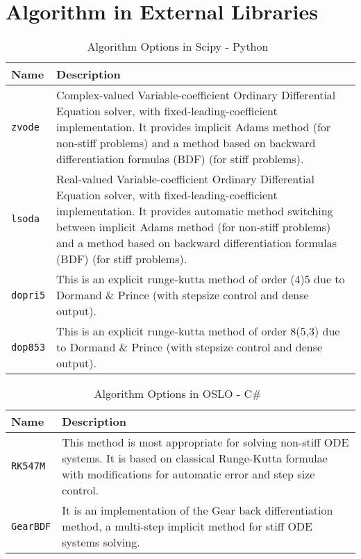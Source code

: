 	

\pagebreak

\section{Algorithm in External Libraries}
\label{alg_externallib}

\begin{table}[ht]
\begin{tabular}{ p{} p{} }
	\textbf{Name} & \textbf{Description} \\
	\toprule
	\verb|zvode| & Complex-valued Variable-coefficient Ordinary Differential Equation solver, with fixed-leading-coefficient implementation. It provides implicit Adams method (for non-stiff problems) and a method based on backward differentiation formulas (BDF) (for stiff problems).\\ \hline
	\verb|lsoda| & Real-valued Variable-coefficient Ordinary Differential Equation solver, with fixed-leading-coefficient implementation. It provides automatic method switching between implicit Adams method (for non-stiff problems) and a method based on backward differentiation formulas (BDF) (for stiff problems).\\ \hline
	\verb|dopri5| & This is an explicit runge-kutta method of order (4)5 due to Dormand \& Prince (with stepsize control and dense output).\\ \hline
	\verb|dop853| & This is an explicit runge-kutta method of order 8(5,3) due to Dormand \& Prince (with stepsize control and dense output).\\
	\bottomrule	
\end{tabular}	
\caption{Algorithm Options in Scipy - Python~\citep{scipyfun}}	
\label{tab_algscipy}
\end{table}

\begin{table}[ht]
\begin{tabular}{ p{} p{} }
	\textbf{Name} & \textbf{Description} \\
	\toprule
	\verb|RK547M| & This method is most appropriate for solving non-stiff ODE systems. It is based on classical Runge-Kutta formulae with modifications for automatic error and step size control.\\ \hline
	\verb|GearBDF| & It is an implementation of the Gear back differentiation method, a multi-step implicit method for stiff ODE systems solving.\\
	\bottomrule	
\end{tabular}	
\caption{Algorithm Options in OSLO - C\#~\citep{oslofun}}	
\label{tab_algodeint}
\end{table}

